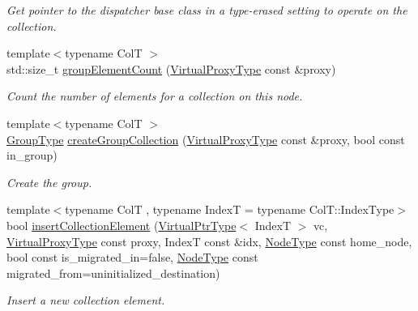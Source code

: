 \begin{DoxyCompactItemize}
\begin{DoxyCompactList}\small\item\em Get pointer to the dispatcher base class in a type-\/erased setting to operate on the collection. \end{DoxyCompactList}\item 
{\footnotesize template$<$typename ColT $>$ }\\std\+::size\+\_\+t \hyperlink{structvt_1_1vrt_1_1collection_1_1_collection_manager_a79fb70bedfb02bc57ae4280345dd9427}{group\+Element\+Count} (\hyperlink{namespacevt_a1b417dd5d684f045bb58a0ede70045ac}{Virtual\+Proxy\+Type} const \&proxy)
\begin{DoxyCompactList}\small\item\em Count the number of elements for a collection on this node. \end{DoxyCompactList}\item 
{\footnotesize template$<$typename ColT $>$ }\\\hyperlink{namespacevt_a27b5e4411c9b6140c49100e050e2f743}{Group\+Type} \hyperlink{structvt_1_1vrt_1_1collection_1_1_collection_manager_a7ac57a8d33e619cbb036c02f15b2b3db}{create\+Group\+Collection} (\hyperlink{namespacevt_a1b417dd5d684f045bb58a0ede70045ac}{Virtual\+Proxy\+Type} const \&proxy, bool const in\+\_\+group)
\begin{DoxyCompactList}\small\item\em Create the group. \end{DoxyCompactList}\item 
{\footnotesize template$<$typename ColT , typename IndexT  = typename Col\+T\+::\+Index\+Type$>$ }\\bool \hyperlink{structvt_1_1vrt_1_1collection_1_1_collection_manager_a86abf996b403b4e6325e26cf577440ee}{insert\+Collection\+Element} (\hyperlink{structvt_1_1vrt_1_1collection_1_1_collection_manager_a086cab4af6af4f869fbf8814c3a9a6a4}{Virtual\+Ptr\+Type}$<$ IndexT $>$ vc, \hyperlink{namespacevt_a1b417dd5d684f045bb58a0ede70045ac}{Virtual\+Proxy\+Type} const proxy, IndexT const \&idx, \hyperlink{namespacevt_a866da9d0efc19c0a1ce79e9e492f47e2}{Node\+Type} const home\+\_\+node, bool const is\+\_\+migrated\+\_\+in=false, \hyperlink{namespacevt_a866da9d0efc19c0a1ce79e9e492f47e2}{Node\+Type} const migrated\+\_\+from=uninitialized\+\_\+destination)
\begin{DoxyCompactList}\small\item\em Insert a new collection element. \end{DoxyCompactList}\item 

\end{DoxyCompactItemize}
